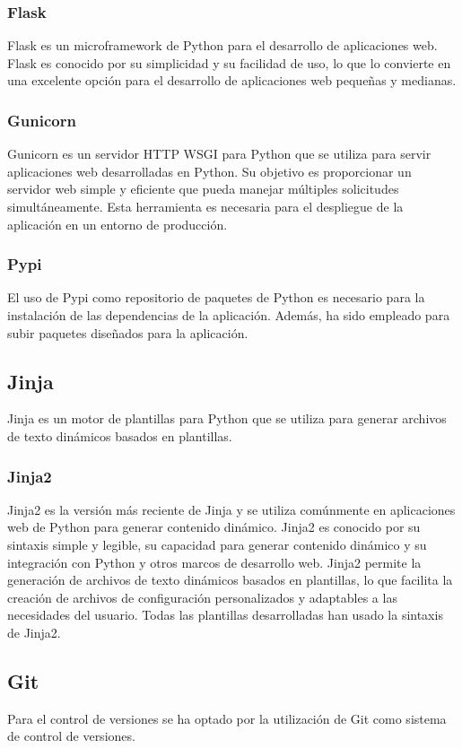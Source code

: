 \documentclass[12pt, a4paper, twoside]{article}
\begin{document}
\subsubsection{Flask}
\cite{flask}
Flask es un microframework de Python para el desarrollo de aplicaciones web.
Flask es conocido por su simplicidad y su facilidad de uso, lo que lo convierte en una excelente opción para el desarrollo de aplicaciones web pequeñas y medianas.
\subsubsection{Gunicorn}
\cite{gunicorn}
Gunicorn es un servidor HTTP WSGI para Python que se utiliza para servir aplicaciones web desarrolladas en Python. Su objetivo es proporcionar un servidor web simple y eficiente que pueda manejar múltiples solicitudes simultáneamente.
Esta herramienta es necesaria para el despliegue de la aplicación en un entorno de producción.
\subsubsection{Pypi}
\cite{pypi}
El uso de Pypi como repositorio de paquetes de Python es necesario para la instalación de las dependencias de la aplicación. Además, ha sido empleado para subir paquetes diseñados para la aplicación.

\subsection{Jinja}
\cite{jinja}
Jinja es un motor de plantillas para Python que se utiliza para generar archivos de texto dinámicos basados en plantillas. 

\subsubsection{Jinja2}
Jinja2 es la versión más reciente de Jinja y se utiliza comúnmente en aplicaciones web de Python para generar contenido dinámico.
Jinja2 es conocido por su sintaxis simple y legible, su capacidad para generar contenido dinámico y su integración con Python y otros marcos de desarrollo web.
Jinja2 permite la generación de archivos de texto dinámicos basados en plantillas, lo que facilita la creación de archivos de configuración personalizados y adaptables a las necesidades del usuario.
Todas las plantillas desarrolladas han usado la sintaxis de Jinja2.



\subsection{Git}
\cite{git}
Para el control de versiones se ha optado por la utilización de Git como sistema de control de versiones.
\end{document}
